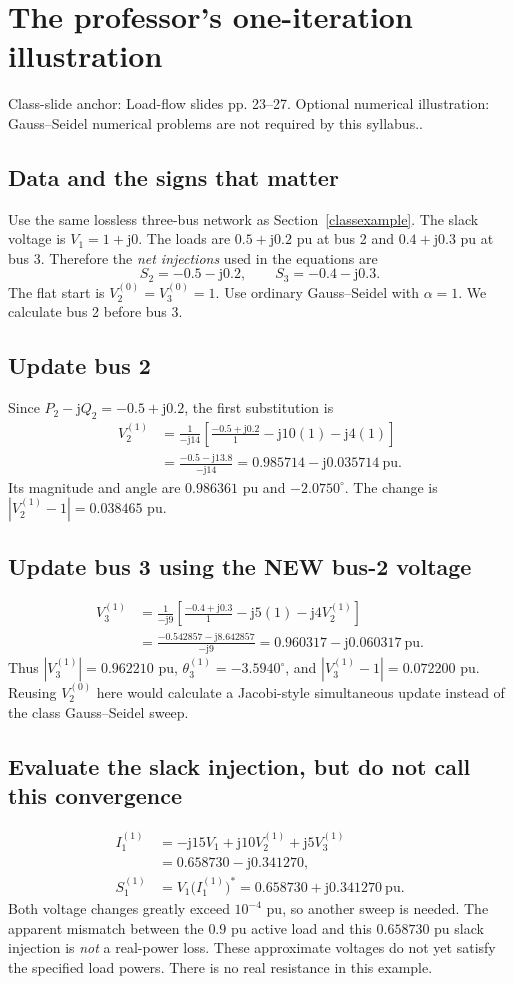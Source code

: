 \documentclass[11pt,a4paper]{article}
\newcommand{\slides}[1]{{\small\color{muted}\textsf{Class-slide anchor: #1.}}\par}
\newcommand{\chapterstart}[2]{\par\needspace{12\baselineskip}\section{#1}\label{#2}}
\newcommand{\ans}[1]{\boxed{#1}}
\newcommand{\jj}{\mathrm j}
\begin{document}
\chapterstart{The professor's one-iteration illustration}{classiteration}
\slides{Load-flow slides pp. 23--27. Optional numerical illustration: Gauss--Seidel numerical problems are not required by this syllabus.}
\subsection{Data and the signs that matter}
Use the same lossless three-bus network as Section~\ref{classexample}. The slack voltage is $V_1=1+\jj0$. The loads are $0.5+\jj0.2$ pu at bus 2 and $0.4+\jj0.3$ pu at bus 3. Therefore the \emph{net injections} used in the equations are
\[
S_2=-0.5-\jj0.2,\qquad S_3=-0.4-\jj0.3.
\]
The flat start is $V_2^{(0)}=V_3^{(0)}=1$. Use ordinary Gauss--Seidel with $\alpha=1$. We calculate bus 2 before bus 3.
\subsection{Update bus 2}
Since $P_2-\jj Q_2=-0.5+\jj0.2$, the first substitution is
\begin{align*}
V_2^{(1)}&=\frac{1}{-\jj14}\left[\frac{-0.5+\jj0.2}{1}-\jj10(1)-\jj4(1)\right]\\
&=\frac{-0.5-\jj13.8}{-\jj14}
=\ans{0.985714-\jj0.035714}\ \mathrm{pu}.
\end{align*}
Its magnitude and angle are $0.986361$ pu and $-2.0750^\circ$. The change is $|V_2^{(1)}-1|=0.038465$ pu.
\subsection{Update bus 3 using the NEW bus-2 voltage}
\begin{align*}
V_3^{(1)}&=\frac{1}{-\jj9}\left[\frac{-0.4+\jj0.3}{1}-\jj5(1)-\jj4V_2^{(1)}\right]\\
&=\frac{-0.542857-\jj8.642857}{-\jj9}
=\ans{0.960317-\jj0.060317}\ \mathrm{pu}.
\end{align*}
Thus $|V_3^{(1)}|=0.962210$ pu, $\theta_3^{(1)}=-3.5940^\circ$, and $|V_3^{(1)}-1|=0.072200$ pu. Reusing $V_2^{(0)}$ here would calculate a Jacobi-style simultaneous update instead of the class Gauss--Seidel sweep.
\subsection{Evaluate the slack injection, but do not call this convergence}
\begin{align*}
I_1^{(1)}&=-\jj15V_1+\jj10V_2^{(1)}+\jj5V_3^{(1)}\\
&=0.658730-\jj0.341270,\\
S_1^{(1)}&=V_1\big(I_1^{(1)}\big)^*
=\ans{0.658730+\jj0.341270}\ \mathrm{pu}.
\end{align*}
Both voltage changes greatly exceed $10^{-4}$ pu, so another sweep is needed. The apparent mismatch between the $0.9$ pu active load and this $0.658730$ pu slack injection is \emph{not} a real-power loss. These approximate voltages do not yet satisfy the specified load powers. There is no real resistance in this example.
\end{document}

